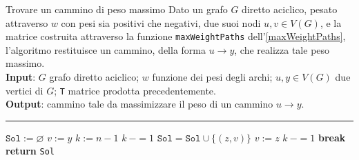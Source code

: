 \documentclass[a4paper, 12pt]{report}
\begin{document}
    \begin{framedalgo}[breakable]{Trovare un cammino di peso massimo}
        Dato un grafo $G$ diretto aciclico, pesato attraverso $w$ con pesi sia positivi che negativi, due suoi nodi $u, v \in V(G)$, e la matrice costruita attraverso la funzione \texttt{maxWeightPaths} dell'\cref{maxWeightPaths}, l'algoritmo restituisce un cammino, della forma $u \rightarrow y$, che realizza tale peso massimo.\\
        \textbf{Input}: $G$ grafo diretto aciclico; $w$ funzione dei pesi degli archi; $u, y \in V(G)$ due vertici di $G$; \texttt{T} matrice prodotta precedentemente.\\
        \textbf{Output}: cammino tale da massimizzare il peso di un cammino $u \rightarrow y$.

        \hrule
        \begin{algorithmic}[1]
                \State $\texttt{Sol} := \varnothing$
                \State $v := y$
                \State $k := n -1$
                        \State $k \ -= 1$
                    \Else
                         
                                \State $\texttt{Sol} = \texttt{Sol} \cup \{(z, v)\}$
                                \State $v := z$
                                \State $k \ -= 1$
                                \State \textbf{break}
                            \EndIf
                        \EndFor
                    \EndIf
                \EndWhile
                \State \textbf{return} \texttt{Sol}
            \EndFunction
        \end{algorithmic}
    \end{framedalgo}
\end{document}
